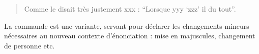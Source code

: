 \begin{quotation}
	Comme le disait très justement xxx : \enquote{Lorsque yyy  \enquote{zzz} il  du tout}.
\end{quotation}

La commande  est une variante, servant pour déclarer les changements mineurs nécessaires au nouveau contexte d'énonciation : mise en majuscules, changement de personne etc.
